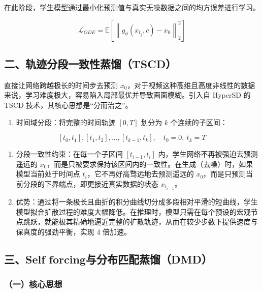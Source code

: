 在此阶段，学生模型通过最小化预测值与真实无噪数据之间的均方误差进行学习。

\[
\mathcal{L}_{ODE}=\mathbb{E}\left[\left\|g_\phi(x_{t_j},c)-x_0\right\|_2^2\right]
\]

\hypertarget{ux4e8cux8f68ux8ff9ux5206ux6bb5ux4e00ux81f4ux6027ux84b8ux998ftscd}{%
\subsection{二、轨迹分段一致性蒸馏（TSCD）}\label{ux4e8cux8f68ux8ff9ux5206ux6bb5ux4e00ux81f4ux6027ux84b8ux998ftscd}}

直接让网络跨越极长的时间步去预测 \(x_0\)，对于视频这种高维且高度非线性的数据来说，学习难度极大，容易陷入局部最优并导致画面模糊。引入自 HyperSD 的 TSCD 技术，其核心思想是``分而治之''。

\begin{enumerate}
\def\labelenumi{\arabic{enumi}.}
\tightlist
\item
  时间域分段：将完整的时间轨迹 \([0,T]\) 划分为 \(k\) 个连续的子区间：
\end{enumerate}

\[
[t_0,t_1],[t_1,t_2],\ldots,[t_{k-1},t_k],\quad t_0=0,\ t_k=T
\]

\begin{enumerate}
\def\labelenumi{\arabic{enumi}.}
\setcounter{enumi}{1}
\item
  分段一致性约束：在每一个子区间 \([t_{i-1},t_i]\) 内，学生网络不再被强迫去预测遥远的 \(x_0\)，而是只被要求保持该区间内的一致性。在生成（去噪）时，如果模型当前处于时间点 \(t_i\)，它不再好高骛远地去预测遥远的 \(x_0\)，而是只预测当前分段的下界端点，即更接近真实数据的状态 \(x_{t_{i-1}}\)。
\item
  优势：通过将一条极长且曲折的积分曲线切分成多段相对平滑的短曲线，学生模型拟合扩散过程的难度大幅降低。在推理时，模型只需在每个预设的宏观节点跳跃，就能极其精确地逼近完整的扩散轨迹，从而在较少步数下提供速度与保真度的强劲平衡，实现 4 倍加速。
\end{enumerate}

\hypertarget{ux4e09self-forcingux4e0eux5206ux5e03ux5339ux914dux84b8ux998fdmd}{%
\subsection{三、Self forcing与分布匹配蒸馏（DMD）}\label{ux4e09self-forcingux4e0eux5206ux5e03ux5339ux914dux84b8ux998fdmd}}

\hypertarget{ux4e00ux6838ux5fc3ux601dux60f3-21}{%
\subsubsection{（一）核心思想}\label{ux4e00ux6838ux5fc3ux601dux60f3-21}}

